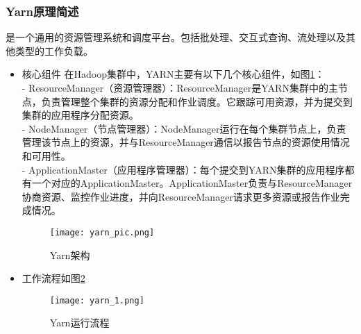 \documentclass[bachelor]{thesis-uestc}
\begin{document}
\subsubsection{Yarn原理简述}
是一个通用的资源管理系统和调度平台。包括批处理、交互式查询、流处理以及其他类型的工作负载。

\begin{itemize}
    

\item 核心组件
在Hadoop集群中，YARN主要有以下几个核心组件，如图\ref{yarn_pic}：\cite{hadoop_zh}\\
- ResourceManager（资源管理器）：ResourceManager是YARN集群中的主节点，负责管理整个集群的资源分配和作业调度。它跟踪可用资源，并为提交到集群的应用程序分配资源。\\
- NodeManager（节点管理器）：NodeManager运行在每个集群节点上，负责管理该节点上的资源，并与ResourceManager通信以报告节点的资源使用情况和可用性。\\
- ApplicationMaster（应用程序管理器）：每个提交到YARN集群的应用程序都有一个对应的ApplicationMaster。ApplicationMaster负责与ResourceManager协商资源、监控作业进度，并向ResourceManager请求更多资源或报告作业完成情况。\\
\begin{figure}[htbp]
    \centering
    \texttt{[image: yarn\_pic.png]}
    \caption{Yarn架构\cite{yarn}}
    \label{yarn_pic}
\end{figure}


\item 工作流程如图\ref{yarn_1}\\

\begin{figure}[htbp]
    \centering
    \texttt{[image: yarn\_1.png]}
    \caption{Yarn运行流程\cite{yarns}}
    \label{yarn_1}
\end{figure}




\end{itemize}
\end{document}
